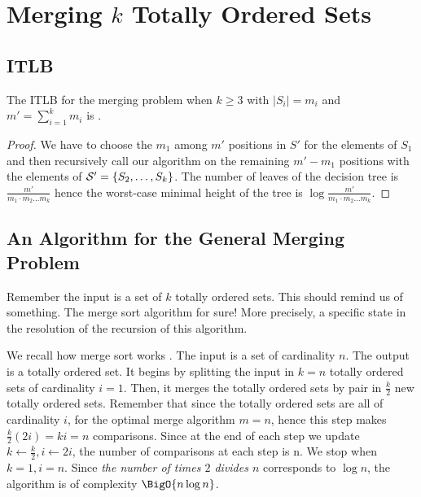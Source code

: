 \section{Merging $k$ Totally Ordered Sets}
\label{tree:merging:kgeq3}


\subsection*{ITLB}
\label{tree:merging:kgeq3:ITLB}


\begin{theorem}
The ITLB for the merging problem when $k \geq 3$ with $|S_i| = m_i$ and $m' =
\sum_{i=1}^{k} m_i$ is .
\end{theorem}

\begin{proof}
We have to choose the $m_1$ among $m'$ positions in $S'$ for the elements of
$S_1$ and then recursively call our algorithm on the remaining $m' - m_1$
positions with the elements of ${\cal S}' = \{S_2, \dots, S_k\}$. The number of
leaves of the decision tree is $\frac{m'}{m_1 \cdot m_2 \dots m_k}$ hence the
worst-case minimal height of the tree is $\log \frac{m'}{m_1 \cdot m_2 \dots
m_k}$.
\end{proof}


\subsection*{An Algorithm for the General Merging Problem}
\label{tree:merging:kgeq3:alg}

Remember the input is a set of $k$ totally ordered sets. This should remind us
of something. The merge sort algorithm for sure! More precisely, a specific
state in the resolution of the recursion of this algorithm.

We recall how merge sort works \cite{leiserson2001introduction}. The input is a
set of cardinality $n$. The output is a totally ordered set. It begins by
splitting the input in $k = n$ totally ordered sets of cardinality $i = 1$.
Then, it merges the totally ordered sets by pair in $\frac{k}{2}$ new totally
ordered sets. Remember that since the totally ordered sets are all of
cardinality $i$, for the optimal merge algorithm $m=n$, hence this step makes
$\frac{k}{2} (2 i) = k i = n$ comparisons. Since at the end of each step we
update $k \gets \frac{k}{2}, i \gets 2i$, the number of comparisons at each
step is n. We stop when $k = 1, i = n$.
Since \emph{the number of times $2$ divides $n$} corresponds to $\log n$, the
algorithm is of complexity $\BigO{n \log n}$.

